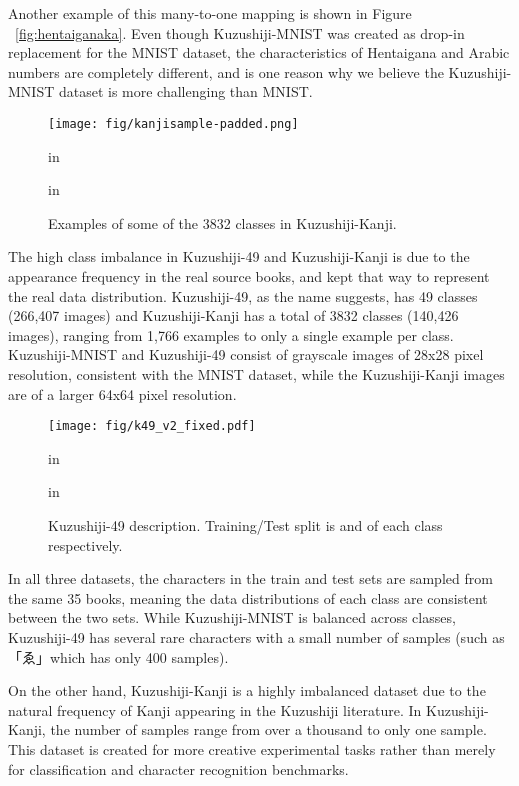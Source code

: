 \documentclass{article}
\begin{document}
\begin{CJK}{UTF8}{min}
Another example of this many-to-one mapping is shown in Figure ~\ref{fig:hentaiganaka}. Even though Kuzushiji-MNIST was created as drop-in replacement for the MNIST dataset, the characteristics of Hentaigana and Arabic numbers are completely different, and is one reason why we believe the Kuzushiji-MNIST dataset is more challenging than MNIST.

\begin{figure}[!htb]
\vskip -0.05in
\begin{center}
\centerline{\texttt{[image: fig/kanjisample-padded.png]}}
 in
\caption{Examples of some of the 3832 classes in Kuzushiji-Kanji.}
\label{fig:kanjisample}
\end{center}
 in
\end{figure}



The high class imbalance in Kuzushiji-49 and Kuzushiji-Kanji is due to the appearance frequency in the real source books, and kept that way to represent the real data distribution. Kuzushiji-49, as the name suggests, has 49 classes (266,407 images) and Kuzushiji-Kanji has a total of 3832 classes (140,426 images), ranging from 1,766 examples to only a single example per class. Kuzushiji-MNIST and Kuzushiji-49 consist of grayscale images of 28x28 pixel resolution, consistent with the MNIST dataset, while the Kuzushiji-Kanji images are of a larger 64x64 pixel resolution.

\begin{figure}[!htb]
\vskip -0.05in
\begin{center}
\centerline{\texttt{[image: fig/k49\_v2\_fixed.pdf]}}
 in
\caption{Kuzushiji-49 description. Training/Test split is  and  of each class respectively.}
\label{fig:k_49_description}
\end{center}
 in
\end{figure}

In all three datasets, the characters in the train and test sets are sampled from the same 35 books, meaning the data distributions of each class are consistent between the two sets. While Kuzushiji-MNIST is balanced across classes, Kuzushiji-49 has several rare characters with a small number of samples (such as「ゑ」which has only  400 samples).

On the other hand, Kuzushiji-Kanji is a highly imbalanced dataset due to the natural frequency of Kanji appearing in the Kuzushiji literature. In Kuzushiji-Kanji, the number of samples range from over a thousand to only one sample. This dataset is created for more creative experimental tasks rather than merely for classification and character recognition benchmarks.


\end{CJK}
\end{document}
